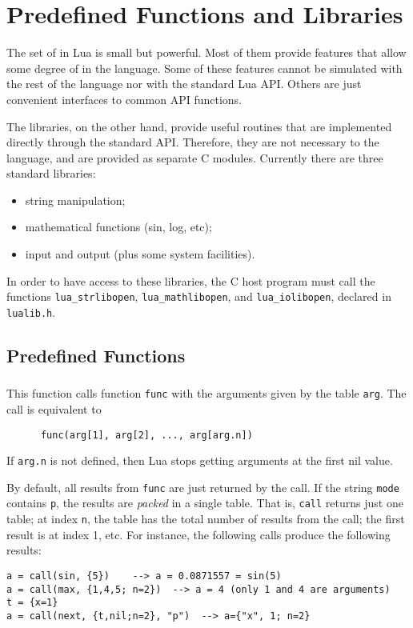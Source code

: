 \section{Predefined Functions and Libraries}

The set of  in Lua is small but powerful.
Most of them provide features that allow some degree of
 in the language.
Some of these features cannot be simulated with the rest of the
language nor with the standard Lua API.
Others are just convenient interfaces to common API functions.

The libraries, on the other hand, provide useful routines
that are implemented directly through the standard API.
Therefore, they are not necessary to the language,
and are provided as separate C modules.
Currently there are three standard libraries:
\begin{itemize}
\item string manipulation;
\item mathematical functions (sin, log, etc);
\item input and output (plus some system facilities).
\end{itemize}
In order to have access to these libraries,
the C host program must call the functions
\verb|lua_strlibopen|, \verb|lua_mathlibopen|, and \verb|lua_iolibopen|,
declared in \verb|lualib.h|.


\subsection{Predefined Functions} \label{predefined}

\subsubsection*{\ff {}}
\label{pdf-call}
This function calls function \verb|func| with
the arguments given by the table \verb|arg|.
The call is equivalent to
\begin{verbatim}
      func(arg[1], arg[2], ..., arg[arg.n])
\end{verbatim}
If \verb|arg.n| is not defined,
then Lua stops getting arguments at the first nil value.

By default,
all results from \verb|func| are just returned by the call.
If the string \verb|mode| contains \verb|p|,
the results are \emph{packed} in a single table.
That is, \verb|call| returns just one table;
at index \verb|n|, the table has the total number of results
from the call;
the first result is at index 1, etc.
For instance, the following calls produce the following results:
\begin{verbatim}
a = call(sin, {5})    --> a = 0.0871557 = sin(5)
a = call(max, {1,4,5; n=2})  --> a = 4 (only 1 and 4 are arguments)
t = {x=1}
a = call(next, {t,nil;n=2}, "p")  --> a={"x", 1; n=2}
\end{verbatim}

